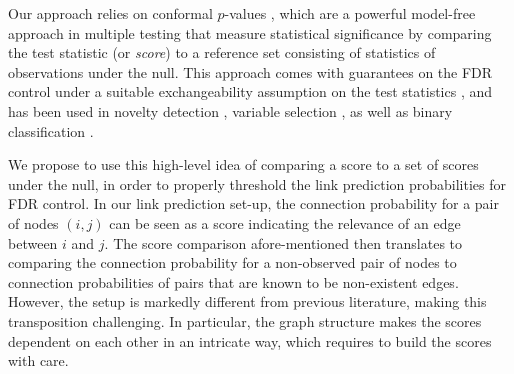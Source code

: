 \documentclass[a4paper, 11pt]{article}
\theoremstyle{remark}
\begin{document}

Our approach relies on conformal $p$-values \citep{bates2023testing, barber15, yang2021bonus}, which are a powerful model-free approach in multiple testing that measure statistical significance by comparing the test statistic (or \textit{score}) to a reference set consisting of statistics of observations under the null. This approach comes with guarantees on the FDR control under a suitable exchangeability assumption on the test statistics \citep{bates2023testing, weinstein2017power, mary2022semi, marandon22b}, and has been used in novelty detection \citep{bates2023testing, yang2021bonus, marandon22b, liang2022integrative}, variable selection \citep{barber15, weinstein2017power}, as well as binary classification \citep{rava2021burden}. 


We propose to use this high-level idea of comparing a score to a set of scores under the null,
in order to properly threshold the link prediction probabilities for FDR control. 
In our link prediction set-up, the connection probability for a pair of nodes $(i,j)$ can be seen as a score indicating the relevance of an edge between $i$ and $j$. The score comparison afore-mentioned then translates to
 comparing the connection probability for a non-observed pair of nodes to connection probabilities of pairs that are known to be non-existent edges. However, the setup is markedly different from previous literature, making this transposition challenging. In particular, the graph structure makes the scores dependent on each other in an intricate way, which requires 
to build the scores with care.%
\end{document}
